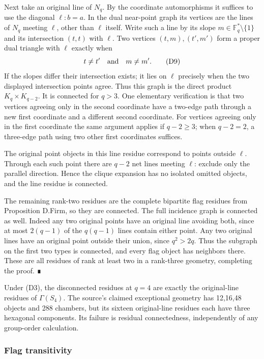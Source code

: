 Next take an original line of \(N_q\). By the coordinate automorphisms
it suffices to use the diagonal \(\ell:b=a\). In the dual near-point
graph its vertices are the lines of \(N_q\) meeting \(\ell\), other than
\(\ell\) itself. Write such a line by its slope
\(m\in\mathbb F_q^*\setminus\{1\}\) and its intersection \((t,t)\) with
\(\ell\). Two vertices \((t,m),(t',m')\) form a proper dual triangle
with \(\ell\) exactly when \[
t\ne t'\quad\hbox{and}\quad m\ne m'.
\tag{D9}
\] If the slopes differ their intersection exists; it lies on \(\ell\)
precisely when the two displayed intersection points agree. Thus this
graph is the direct product \(K_q\times K_{q-2}\). It is connected for
\(q>3\). One elementary verification is that two vertices agreeing only
in the second coordinate have a two-edge path through a new first
coordinate and a different second coordinate. For vertices agreeing only
in the first coordinate the same argument applies if \(q-2\ge3\); when
\(q-2=2\), a three-edge path using two other first coordinates suffices.

The original point objects in this line residue correspond to points
outside \(\ell\). Through each such point there are \(q-2\) net lines
meeting \(\ell\): exclude only the parallel direction. Hence the clique
expansion has no isolated omitted objects, and the line residue is
connected.

The remaining rank-two residues are the complete bipartite flag residues
from Proposition D.Firm, so they are connected. The full incidence graph
is connected as well. Indeed any two original points have an original
line avoiding both, since at most \(2(q-1)\) of the \(q(q-1)\) lines
contain either point. Any two original lines have an original point
outside their union, since \(q^2>2q\). Thus the subgraph on the first
two types is connected, and every flag object has neighbors there. These
are all residues of rank at least two in a rank-three geometry,
completing the proof. ∎

Under (D3), the disconnected residues at \(q=4\) are exactly the
original-line residues of \(\Gamma(S_4)\). The source's claimed
exceptional geometry has 12,16,48 objects and 288 chambers, but its
sixteen original-line residues each have three hexagonal components. Its
failure is residual connectedness, independently of any group-order
calculation.

\subsubsection{Flag transitivity}\label{flag-transitivity}

